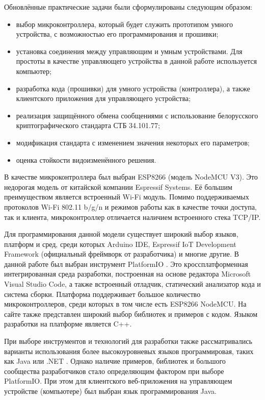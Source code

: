 	Обновлённые практические задачи были сформулированы следующим образом:
	
	\begin{itemize}
		\item выбор микроконтроллера, который будет служить прототипом умного устройства,
		с возможностью его программирования и прошивки;
		\item установка соединения между управляющим и умным устройствами. Для простоты в качестве
		управляющего устройства в данной работе используется компьютер;
		\item разработка кода (прошивки) для умного устройства (контроллера), а также клиентского
		приложения для управляющего устройства;
		\item реализация защищённого обмена сообщениями с использование белорусского криптографического
		стандарта СТБ 34.101.77;
		\item модификация стандарта с изменением значения некоторых его параметров;
		\item оценка стойкости видоизменённого решения.
	\end{itemize}

	В качестве микроконтроллера был выбран ESP8266 (модель NodeMCU V3). Это недорогая модель от
	китайской компании Espressif Systems. Её большим преимуществом является встроенный Wi-Fi модуль. 
	Помимо поддерживаемых протоколов Wi-Fi 802.11 b/g/n и режимов работы как в качестве точки доступа,
	так и клиента, микроконтроллер отличается наличием встроенного стека TCP/IP.
	
	Для программирования данной модели существует широкий выбор языков, платформ и сред, среди
	которых Arduino IDE, Espressif IoT Development Framework (официальный фреймворк от разработчика)
	и многие другие. В данной работе был выбран инструмент PlatformIO \cite{platformio}. Это
	кроссплатформенная интегрированная среда разработки, построенная на основе редактора Microsoft 
	Visual Studio Code, а также встроенный отладчик, статический анализатор кода и система сборки.
	Платформа поддерживает большое количество микроконтроллеров, среди которых в том числе есть
	ESP8266 NodeMCU. На сайте также представлен широкий выбор библиотек и примеров с кодом.
	Языком разработки на платформе является C++.
	
	При выборе инструментов и технологий для разработки также рассматривались варианты использования
	более высокоуровневых языков программировая, таких как Java \cite{microej} или .NET \cite{nanoFramework}.
	Однако наличие примеров, библиотек и большого сообщества разработчиков стало определяющим
	фактором при выборе PlatformIO. При этом для клиентского веб-приложения на управляющем устройстве
	(компьютере) был выбран язык программирования Java.
	
